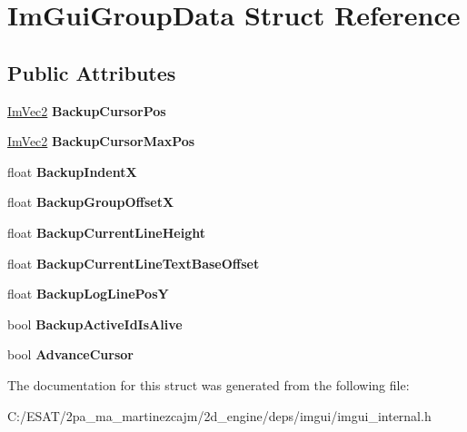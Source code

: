 \hypertarget{struct_im_gui_group_data}{}\section{Im\+Gui\+Group\+Data Struct Reference}
\label{struct_im_gui_group_data}
\subsection*{Public Attributes}
\begin{DoxyCompactItemize}
\item 
\mbox{\label{struct_im_gui_group_data_a8b29e2d9081876fd4847b1cd86c60500}} 
\hyperlink{struct_im_vec2}{Im\+Vec2} {\bfseries Backup\+Cursor\+Pos}
\item 
\mbox{\label{struct_im_gui_group_data_abb83c4db050ef7d20485902cc14c4a0d}} 
\hyperlink{struct_im_vec2}{Im\+Vec2} {\bfseries Backup\+Cursor\+Max\+Pos}
\item 
\mbox{\label{struct_im_gui_group_data_a9d39092c1c154ba4809ae79e47baeb64}} 
float {\bfseries Backup\+IndentX}
\item 
\mbox{\label{struct_im_gui_group_data_a0cee1b14b574a4bf883ceb1be58a9332}} 
float {\bfseries Backup\+Group\+OffsetX}
\item 
\mbox{\label{struct_im_gui_group_data_a6e17deccf50138bdf436fa172bb453e2}} 
float {\bfseries Backup\+Current\+Line\+Height}
\item 
\mbox{\label{struct_im_gui_group_data_a3745219bd1f4c6ee5080d8d0aaa8a712}} 
float {\bfseries Backup\+Current\+Line\+Text\+Base\+Offset}
\item 
\mbox{\label{struct_im_gui_group_data_af67f52c70f74a3b7bce8ce46affc856b}} 
float {\bfseries Backup\+Log\+Line\+PosY}
\item 
\mbox{\label{struct_im_gui_group_data_ac27968bcfd94ba2e4b1543b95d032f35}} 
bool {\bfseries Backup\+Active\+Id\+Is\+Alive}
\item 
\mbox{\label{struct_im_gui_group_data_a2bfc0ee6236ec2ace16634a34eda72d7}} 
bool {\bfseries Advance\+Cursor}
\end{DoxyCompactItemize}


The documentation for this struct was generated from the following file\+:\begin{DoxyCompactItemize}
\item 
C\+:/\+E\+S\+A\+T/2pa\+\_\+ma\+\_\+martinezcajm/2d\+\_\+engine/deps/imgui/imgui\+\_\+internal.\+h\end{DoxyCompactItemize}
